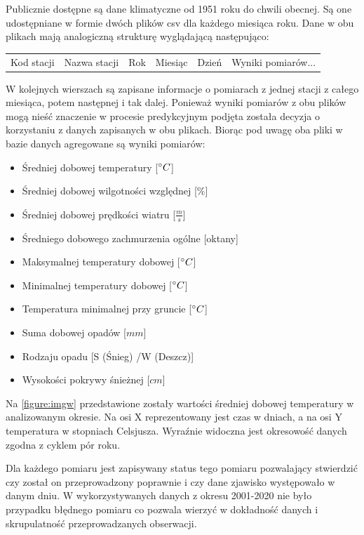 \documentclass[10pt,a4paper]{article}
\begin{document}
Publicznie dostępne są dane klimatyczne od 1951 roku do chwili obecnej. Są one udostępniane w formie dwóch plików csv dla każdego miesiąca roku. Dane w obu plikach mają analogiczną strukturę wyglądającą następująco:
\begin{center}
	\begin{tabular}{|c|c|c|c|c|c}
		Kod stacji & Nazwa stacji & Rok & Miesiąc & Dzień & Wyniki pomiarów...
	\end{tabular}
\end{center}
W kolejnych wierszach są zapisane informacje o pomiarach z jednej stacji z całego miesiąca, potem następnej i tak dalej. Ponieważ wyniki pomiarów z obu plików mogą nieść znaczenie w procesie predykcyjnym podjęta została decyzja o korzystaniu z danych zapisanych w obu plikach. Biorąc pod uwagę oba pliki w bazie danych agregowane są wyniki pomiarów: 
\begin{itemize}
	\item Średniej dobowej temperatury [$\degree C$]
	\item Średniej dobowej wilgotności względnej [\%]
	\item Średniej dobowej prędkości wiatru [$\frac{m}{s}$]
	\item Średniego dobowego zachmurzenia ogólne [oktany]
	\item Maksymalnej temperatury dobowej [$\degree C$]
	\item Minimalnej temperatury dobowej [$\degree C$]
	\item Temperatura minimalnej przy gruncie [$\degree C$]
	\item Suma dobowej opadów [$mm$]
	\item Rodzaju opadu [S (Śnieg) /W (Deszcz)]
	\item Wysokości pokrywy śnieżnej [$cm$]
\end{itemize}
Na \autoref{figure:imgw} przedstawione zostały wartości średniej dobowej temperatury w analizowanym okresie. Na osi X reprezentowany jest czas w dniach, a na osi Y temperatura w stopniach Celsjusza. Wyraźnie widoczna jest okresowość danych zgodna z cyklem pór roku.  

Dla każdego pomiaru jest zapisywany status tego pomiaru pozwalający stwierdzić czy został on przeprowadzony poprawnie i czy dane zjawisko występowało w danym dniu. W wykorzystywanych danych z okresu 2001-2020 nie było przypadku błędnego pomiaru co pozwala wierzyć w dokładność danych i skrupulatność przeprowadzanych obserwacji. 
\end{document}
